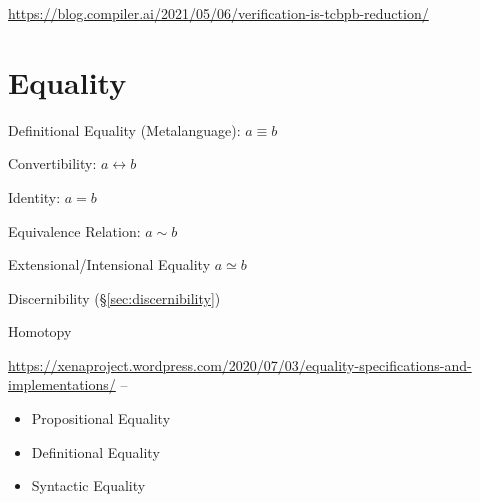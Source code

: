 \url{https://blog.compiler.ai/2021/05/06/verification-is-tcbpb-reduction/}



\section{Equality}\label{sec:equality}\cite{baez15}

Definitional Equality (Metalanguage): $a \equiv b$

Convertibility: $a \leftrightarrow b$

Identity: $a = b$

Equivalence Relation: $a \sim b$

Extensional/Intensional Equality $a \simeq b$

Discernibility (\S\ref{sec:discernibility})

Homotopy

\url{https://xenaproject.wordpress.com/2020/07/03/equality-specifications-and-implementations/}
--
\begin{itemize}
  \item Propositional Equality
  \item Definitional Equality
  \item Syntactic Equality
\end{itemize}




